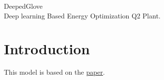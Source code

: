 \documentclass{article}
\begin{document}
\begin{center}
    \huge{DeepedGlove}\\[0.4em]
    \Large{Deep learning Based Energy Optimization Q2 Plant.}\\[0.2em]
\end{center}


\section{Introduction}
This model is based on the \href{https://arxiv.org/pdf/2102.11492.pdf}{paper}.
\end{document}
